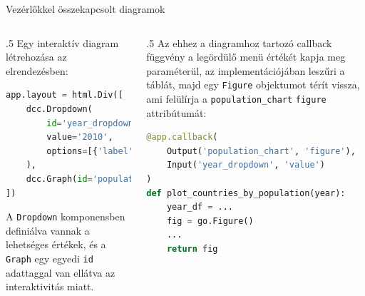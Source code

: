 \documentclass[english, aspectratio=169]{beamer}
\begin{document}
\begin{frame}[fragile]{Vezérlőkkel összekapcsolt diagramok}
	\begin{columns}
		\begin{column}{.5\textwidth}
			Egy interaktív diagram létrehozása az elrendezésben:
			\begin{lstlisting}[language=python]
app.layout = html.Div([
	dcc.Dropdown(
		id='year_dropdown',
		value='2010',
		options=[{'label': year, 'value': str(year)} for year in range(1974, 2019)]
	),
	dcc.Graph(id='population_chart')
])
			\end{lstlisting}
			A \texttt{Dropdown} komponensben definiálva vannak a lehetséges értékek, és a \texttt{Graph} egy egyedi \texttt{id} adattaggal van ellátva az interaktivitás miatt.
		\end{column}
		\begin{column}{.5\textwidth}
			Az ehhez a diagramhoz tartozó callback függvény a legördülő menü értékét kapja meg paraméterül, az implementációjában leszűri a táblát, majd egy \texttt{Figure} objektumot térít vissza, ami felülírja a \texttt{population\_chart} \texttt{figure} attribútumát:
			\begin{lstlisting}[language=python]
@app.callback(
	Output('population_chart', 'figure'),
	Input('year_dropdown', 'value')
)
def plot_countries_by_population(year):
	year_df = ...
	fig = go.Figure()
	...
	return fig
			\end{lstlisting}
		\end{column}
	\end{columns}
\end{frame}
\end{document}
